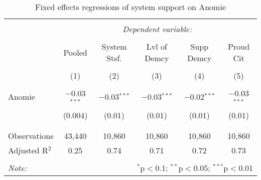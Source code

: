 
\begin{table}[!htbp] \centering 
  \caption{Fixed effects regressions of system support on Anomie} 
  \label{tab:sys_anomie} 
\begin{tabular}{@{\extracolsep{5pt}}lccccc} 
\\[-1.8ex]\hline 
\hline \\[-1.8ex] 
 & \multicolumn{5}{c}{\textit{Dependent variable:}} \\ 
\cline{2-6} 
\\[-1.8ex] & Pooled & System Stsf. & Lvl of Demcy & Supp Demcy & Proud Cit \\ 
\\[-1.8ex] & (1) & (2) & (3) & (4) & (5)\\ 
\hline \\[-1.8ex] 
 Anomie & $-$0.03$^{***}$ & $-$0.03$^{***}$ & $-$0.03$^{***}$ & $-$0.02$^{***}$ & $-$0.03$^{***}$ \\ 
  & (0.004) & (0.01) & (0.01) & (0.01) & (0.01) \\ 
  & & & & & \\ 
\hline \\[-1.8ex] 
Observations & 43,440 & 10,860 & 10,860 & 10,860 & 10,860 \\ 
Adjusted R$^{2}$ & 0.25 & 0.74 & 0.71 & 0.72 & 0.73 \\ 
\hline 
\hline \\[-1.8ex] 
\textit{Note:}  & \multicolumn{5}{r}{$^{*}$p$<$0.1; $^{**}$p$<$0.05; $^{***}$p$<$0.01} \\ 
\end{tabular} 
\end{table} 

